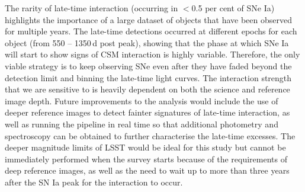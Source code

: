 \documentclass[a4paper,oneside,12pt, class=Latex/Classes/PhDthesisPSnPDF, crop=false]{standalone}
\begin{document}
The rarity of late-time interaction (occurring in $<$0.5 per cent of SNe Ia) highlights the importance of a large dataset of objects that have been observed for multiple years. The late-time detections occurred at different epochs for each object (from 550 -- 1350\,d post peak), showing that the phase at which SNe Ia will start to show signs of CSM interaction is highly variable. Therefore, the only viable strategy is to keep observing SNe even after they have faded beyond the detection limit and binning the late-time light curves. The interaction strength that we are sensitive to is heavily dependent on both the science and reference image depth. Future improvements to the analysis would include the use of deeper reference images to detect fainter signatures of late-time interaction, as well as running the pipeline in real time so that additional photometry and spectroscopy can be obtained to further characterise the late-time excesses. The deeper magnitude limits of LSST would be ideal for this study but cannot be immediately performed when the survey starts because of the requirements of deep reference images, as well as the need to wait up to more than three years after the SN Ia peak for the interaction to occur. 


\end{document}
